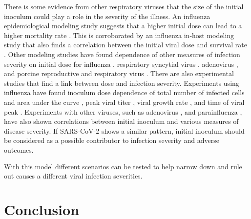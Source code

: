 There is some evidence from other respiratory viruses that the size of the initial inoculum could play a role in the severity of the illness. An influenza epidemiological modeling study suggests that a higher initial dose can lead to a higher mortality rate \citep{paulo10}. This is corroborated by an influenza in-host modeling study that also finds a correlation between the initial viral dose and survival rate \citep{price15}. Other modeling studies have found dependence of other measures of infection severity on initial dose for influenza \citep{moore20}, respiratory syncytial virus \citep{wethington19}, adenovirus \citep{li14}, and porcine reproductive and respiratory virus \citep{go19}. There are also experimental studies that find a link between dose and infection severity. Experiments using influenza have found inoculum dose dependence of total number of infected cells and area under the curve \citep{manicassamy10}, peak viral titer \citep{ginsberg52,iida63,ottolini05}, viral growth rate \citep{ginsberg52}, and time of viral peak \citep{iida63,ginsberg52}. Experiments with other viruses, such as adenovirus \citep{prince93}, and parainfluenza \citep{ottolini96}, have also shown correlations between initial inoculum and various measures of disease severity. If SARS-CoV-2 shows a similar pattern, initial inoculum should be considered as a possible contributor to infection severity and adverse outcomes.

With this model different scenarios can be tested to help narrow down and rule out causes a different viral infection severities. 

\section{Conclusion}

